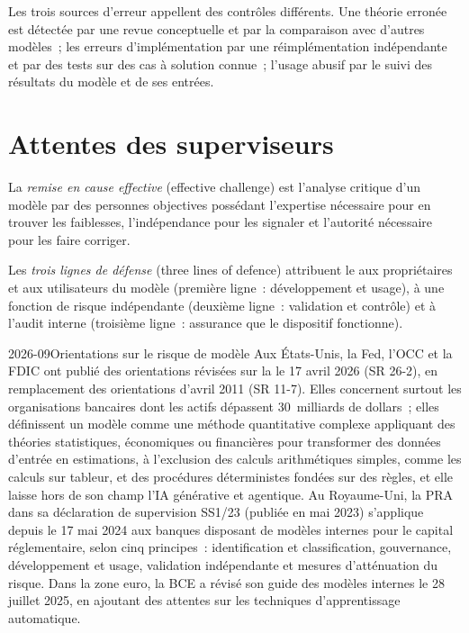 Les trois sources d'erreur appellent des contrôles différents. Une théorie erronée est détectée par une revue conceptuelle et par
la comparaison avec d'autres modèles~; les erreurs d'implémentation par une réimplémentation indépendante et par
des tests sur des cas à solution connue~; l'usage abusif par le suivi des résultats du modèle et de ses entrées.

\section{Attentes des superviseurs}

\begin{definition}\label{def:rc:model-risk-and-validation:challenge}
La \emph{remise en cause effective} (effective challenge) est l'analyse critique d'un modèle par des personnes objectives
possédant l'expertise nécessaire pour en trouver les faiblesses, l'indépendance pour les signaler et l'autorité
nécessaire pour les faire corriger.
\end{definition}

\begin{definition}\label{def:rc:model-risk-and-validation:lines}
Les \emph{trois lignes de défense} (three lines of defence) attribuent le  aux
propriétaires et aux utilisateurs du modèle (première ligne~: développement et usage), à une fonction de risque indépendante (deuxième ligne~:
validation et contrôle) et à l'audit interne (troisième ligne~: assurance que le dispositif fonctionne).
\end{definition}

\begin{dated}{2026-09}{Orientations sur le risque de modèle}\label{dat:rc:model-risk-and-validation:rules}
Aux États-Unis, la Fed, l'OCC et la FDIC ont publié des orientations révisées sur la  le 17 avril 2026 (SR 26-2), en remplacement des orientations d'avril 2011 (SR 11-7). Elles concernent surtout
les organisations bancaires dont les actifs dépassent 30~milliards de dollars~; elles définissent un modèle comme une
méthode quantitative complexe appliquant des théories statistiques, économiques ou financières pour transformer des
données d'entrée en estimations, à l'exclusion des calculs arithmétiques simples, comme les calculs sur tableur, et des
procédures déterministes fondées sur des règles, et elle laisse hors de son champ l'IA générative et agentique. Au Royaume-Uni, la PRA
dans sa déclaration de supervision SS1/23 (publiée en mai 2023) s'applique depuis le 17 mai 2024 aux banques disposant de modèles internes
pour le capital réglementaire, selon cinq principes~: identification et classification, gouvernance,
développement et usage, validation indépendante et mesures d'atténuation du risque. Dans la zone euro, la BCE a révisé son
guide des modèles internes le 28 juillet 2025, en ajoutant des attentes sur les techniques d'apprentissage automatique.
\end{dated}

